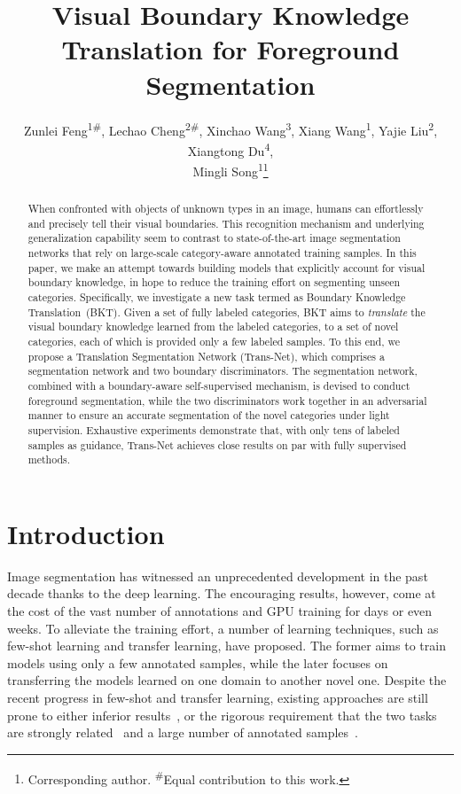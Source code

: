 \documentclass[letterpaper]{article} %
\title{Visual Boundary Knowledge Translation for Foreground Segmentation}
\author{
    Zunlei Feng\textsuperscript{\rm 1\#},
    Lechao Cheng\textsuperscript{\rm 2\#},
    Xinchao Wang\textsuperscript{\rm 3},
    Xiang Wang\textsuperscript{\rm 1},
    Yajie Liu\textsuperscript{\rm 2},
    Xiangtong Du\textsuperscript{\rm 4}, \\
    Mingli Song\textsuperscript{\rm 1}\thanks{Corresponding author. \textsuperscript{\#}Equal contribution to this work.}\\
}
\begin{document}

\def\mathbi#1{\textbf{\em #1}}

\maketitle

\begin{abstract}
\vspace{-0.2em}
When confronted with objects of unknown types in an image, humans can effortlessly and precisely tell their visual boundaries. This recognition mechanism and underlying generalization capability seem to contrast to state-of-the-art image segmentation networks that rely on large-scale {category-aware} annotated training samples. In this paper, we make an attempt towards building models that explicitly account for visual boundary knowledge, in hope to reduce the training effort on segmenting unseen categories.
Specifically, we investigate a new task  termed as Boundary Knowledge Translation~(BKT).
Given a set of fully labeled categories, BKT aims to \emph{translate} the visual boundary knowledge
learned from the labeled categories, to a set of novel categories, each of which is provided only a few labeled samples.
To this end, we propose a Translation Segmentation Network (Trans-Net), which comprises a segmentation network and two boundary discriminators. The segmentation network, combined with a boundary-aware self-supervised mechanism, is devised to conduct foreground segmentation, while the two discriminators work together in an adversarial manner to ensure an accurate segmentation of the novel categories under light supervision.
Exhaustive experiments demonstrate that, with only tens of labeled samples as guidance, Trans-Net achieves close results on par with fully supervised methods.
\end{abstract}

\vspace{-0.9em}
\section{Introduction}
Image segmentation has witnessed an
unprecedented development in the past decade
thanks to the deep learning.
The encouraging results, however, come at
the cost of the vast number of annotations
and  GPU training for days or even weeks.
To alleviate the training effort,
a number of learning techniques,
such as few-shot learning and transfer learning,
have proposed.
The former aims to train models using
only a few annotated samples,
while the later focuses on
transferring the models learned on one domain
to another novel one.
Despite the recent progress  in few-shot and transfer learning,
existing approaches are still prone to either inferior results~\citep{shaban2017one-shot,siam2019amp:,wang2019panet:},
or the {rigorous requirement that the two tasks are strongly related}~\citep{Dai2019Transfer,sun2019not}
and a large number of annotated samples~\citep{hong2017weakly,li2018weakly-,papandreou2015weakly-and}.
\end{document}

